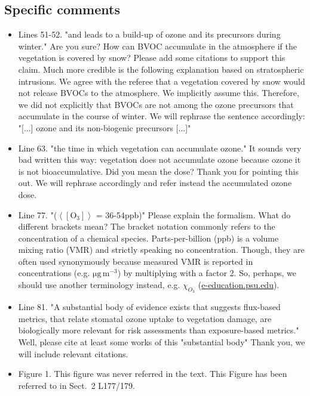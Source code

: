 \documentclass{scrartcl}
\begin{document}
\subsection*{Specific comments} 
\begin{itemize}
    
\item {\color{blue}Lines 51-52. "and leads to a build-up of ozone and its precursors during winter." Are you sure? How can BVOC accumulate in the atmosphere if the vegetation is covered by snow? Please add some citations to support this claim. Much more credible is the following explanation based on stratospheric intrusions.}
We agree with the referee that a vegetation covered by snow would not release BVOCs to the atmosphere. We implicitly assume this. Therefore, we did not explicitly that BVOCs are not among the ozone precursors that accumulate in the course of winter. We will rephrase the sentence accordingly: "[...] ozone and its non-biogenic precursors [...]"

\item {\color{blue}Line 63. "the time in which vegetation can accumulate ozone." 
It sounds very bad written this way: vegetation does not accumulate ozone because ozone it is not bioaccumulative. Did you mean the dose?}
Thank you for pointing this out. We will rephrase accordingly and refer instead the accumulated ozone dose.

\item {\color{blue}Line 77. "($\left<[\mathrm{O_3}]\right>$ = 36-54ppb)" Please explain the formalism. What do different brackets mean?} The bracket notation commonly refers to the concentration of a chemical species. Parts-per-billion (ppb) is a volume mixing ratio (VMR) and strictly speaking no concentration. Though, they are often used synonymously because measured VMR is reported in concentrations (e.g. $\mathrm{\mu g\,m^{-3}}$) by multiplying with a factor 2. So, perhaps, we should use another terminology instead, e.g. $\chi_{O_3}$ (\href{https://www.e-education.psu.edu/meteo300/node/534}{e-education.psu.edu}).

\item {\color{blue}Line 81. "A substantial body of evidence exists that suggests flux-based metrics, that relate stomatal ozone uptake to vegetation damage, are biologically more relevant for risk assessments than exposure-based metrics." 
Well, please cite at least some works of this "substantial body"} Thank you, we will include relevant citations.

\item {\color{blue}Figure 1. This figure was never referred in the text.}
This Figure has been referred to in Sect.~2 L177/179.


\end{itemize}
\end{document}

